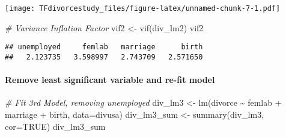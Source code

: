 \documentclass[
]{article}
\newenvironment{Shaded}{\begin{snugshade}}{\end{snugshade}}
\newcommand{\AttributeTok}[1]{\textcolor[rgb]{0.77,0.63,0.00}{#1}}
\newcommand{\CommentTok}[1]{\textcolor[rgb]{0.56,0.35,0.01}{\textit{#1}}}
\newcommand{\ConstantTok}[1]{\textcolor[rgb]{0.00,0.00,0.00}{#1}}
\newcommand{\DecValTok}[1]{\textcolor[rgb]{0.00,0.00,0.81}{#1}}
\newcommand{\FunctionTok}[1]{\textcolor[rgb]{0.00,0.00,0.00}{#1}}
\newcommand{\NormalTok}[1]{#1}
\newcommand{\OtherTok}[1]{\textcolor[rgb]{0.56,0.35,0.01}{#1}}
\newcommand{\SpecialCharTok}[1]{\textcolor[rgb]{0.00,0.00,0.00}{#1}}
\newcommand{\StringTok}[1]{\textcolor[rgb]{0.31,0.60,0.02}{#1}}
\begin{document}
\begin{Shaded}
\end{Shaded}

\texttt{[image: TFdivorcestudy\_files/figure-latex/unnamed-chunk-7-1.pdf]}

\begin{Shaded}
\begin{Highlighting}[]
\CommentTok{\# Variance Inflation Factor}
\NormalTok{vif2 }\OtherTok{\textless{}{-}} \FunctionTok{vif}\NormalTok{(div\_lm2)}
\NormalTok{vif2         }
\end{Highlighting}
\end{Shaded}

\begin{verbatim}
## unemployed     femlab   marriage      birth 
##   2.123735   3.598997   2.743709   2.571650
\end{verbatim}

\hypertarget{remove-least-significant-variable-and-re-fit-model}{%
\paragraph{Remove least significant variable and re-fit
model}\label{remove-least-significant-variable-and-re-fit-model}}

\begin{Shaded}
\begin{Highlighting}[]
\CommentTok{\# Fit 3rd Model, removing unemployed}
\NormalTok{div\_lm3 }\OtherTok{\textless{}{-}} \FunctionTok{lm}\NormalTok{(divorce }\SpecialCharTok{\textasciitilde{}}\NormalTok{ femlab }\SpecialCharTok{+}\NormalTok{ marriage }\SpecialCharTok{+}\NormalTok{ birth, }\AttributeTok{data=}\NormalTok{divusa)}
\NormalTok{div\_lm3\_sum }\OtherTok{\textless{}{-}} \FunctionTok{summary}\NormalTok{(div\_lm3, }\AttributeTok{cor=}\ConstantTok{TRUE}\NormalTok{)}
\NormalTok{div\_lm3\_sum}
\end{Highlighting}
\end{Shaded}
\end{document}

